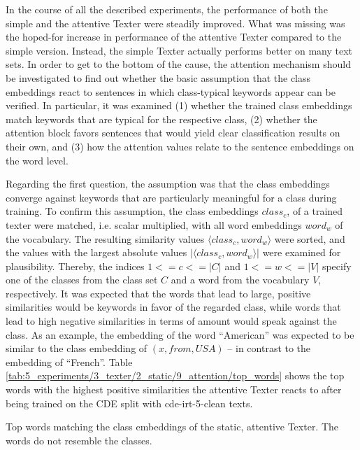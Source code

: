 In the course of all the described experiments, the performance of both the simple and the attentive Texter were steadily improved. What was missing was the hoped-for increase in performance of the attentive Texter compared to the simple version. Instead, the simple Texter actually performs better on many text sets. In order to get to the bottom of the cause, the attention mechanism should be investigated to find out whether the basic assumption that the class embeddings react to sentences in which class-typical keywords appear can be verified. In particular, it was examined (1) whether the trained class embeddings match keywords that are typical for the respective class, (2) whether the attention block favors sentences that would yield clear classification results on their own, and (3) how the attention values relate to the sentence embeddings on the word level.

Regarding the first question, the assumption was that the class embeddings converge against keywords that are particularly meaningful for a class during training. To confirm this assumption, the class embeddings $class_c$, of a trained texter were matched, i.e. scalar multiplied, with all word embeddings $word_w$ of the vocabulary. The resulting similarity values $\langle class_c, word_w \rangle$ were sorted, and the values with the largest absolute values $|\langle class_c, word_w \rangle|$ were examined for plausibility. Thereby, the indices $1 <= c <= |C|$ and $1 <= w <= |V|$ specify one of the classes from the class set $C$ and a word from the vocabulary $V$, respectively. It was expected that the words that lead to large, positive similarities would be keywords in favor of the regarded class, while words that lead to high negative similarities in terms of amount would speak against the class. As an example, the embedding of the word ``American'' was expected to be similar to the class embedding of $(x, from, USA)$ -- in contrast to the embedding of ``French''. Table \autoref{tab:5_experiments/3_texter/2_static/9_attention/top_words} shows the top words with the highest positive similarities the attentive Texter reacts to after being trained on the CDE split with cde-irt-5-clean texts.

\begin{table}[h]
    \makebox[\textwidth][c]{
        
    }
    \caption{Top words matching the class embeddings of the static, attentive Texter. The words do not resemble the classes.}
    \label{tab:5_experiments/3_texter/2_static/9_attention/top_words}
\end{table}

